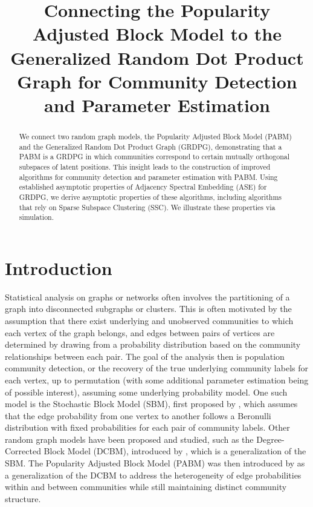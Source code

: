 \documentclass[12pt]{article}
\title{Connecting the Popularity Adjusted Block Model to the Generalized Random
Dot Product Graph for Community Detection and Parameter Estimation}
\author{}
\date{\vspace{-2.5em}}
\def\spacingset#1{\renewcommand{\baselinestretch}%
{#1}\small\normalsize} \spacingset{1}
\providecommand{\tightlist}{%
  \setlength{\itemsep}{0pt}\setlength{\parskip}{0pt}}
\begin{document}
\maketitle
\begin{abstract}
We connect two random graph models, the Popularity Adjusted Block Model
(PABM) and the Generalized Random Dot Product Graph (GRDPG),
demonstrating that a PABM is a GRDPG in which communities correspond to
certain mutually orthogonal subspaces of latent positions. This insight
leads to the construction of improved algorithms for community detection
and parameter estimation with PABM. Using established asymptotic
properties of Adjacency Spectral Embedding (ASE) for GRDPG, we derive
asymptotic properties of these algorithms, including algorithms that
rely on Sparse Subspace Clustering (SSC). We illustrate these properties
via simulation.
\end{abstract}

\providecommand{\tightlist}{%
  \setlength{\itemsep}{0pt}\setlength{\parskip}{0pt}}
\newcommand{\diag}{\text{diag}}
\newcommand{\tr}{\text{Tr}}
\newcommand{\blockdiag}{\text{blockdiag}}
\newcommand{\indep}{\stackrel{\text{indep}}{\sim}}
\newcommand{\iid}{\stackrel{\text{iid}}{\sim}}
\newcommand{\Bernoulli}{\text{Bernoulli}}
\newcommand{\Betadist}{\text{Beta}}
\newtheorem{definition}{Definition}
\newtheorem{theorem}{Theorem}
\newtheorem{lemma}{Lemma}
\theoremstyle{remark}
\newtheorem*{remark}{Remark}
\theoremstyle{definition}
\newtheorem*{example}{Example}
\newpage
\spacingset{1.5} %

\hypertarget{introduction}{%
\section{Introduction}\label{introduction}}

Statistical analysis on graphs or networks often involves the
partitioning of a graph into disconnected subgraphs or clusters. This is
often motivated by the assumption that there exist underlying and
unobserved communities to which each vertex of the graph belongs, and
edges between pairs of vertices are determined by drawing from a
probability distribution based on the community relationships between
each pair. The goal of the analysis then is population community
detection, or the recovery of the true underlying community labels for
each vertex, up to permutation (with some additional parameter
estimation being of possible interest), assuming some underlying
probability model. One such model is the Stochastic Block Model (SBM),
first proposed by \citet{doi:10.1080/0022250X.1971.9989788}, which
assumes that the edge probability from one vertex to another follows a
Beronulli distribution with fixed probabilities for each pair of
community labels. Other random graph models have been proposed and
studied, such as the Degree-Corrected Block Model (DCBM), introduced by
\citet{Karrer_2011}, which is a generalization of the SBM. The
Popularity Adjusted Block Model (PABM) was then introduced by
\citet*{307cbeb9b1be48299388437423d94bf1} as a generalization of the
DCBM to address the heterogeneity of edge probabilities within and
between communities while still maintaining distinct community
structure.
\end{document}
